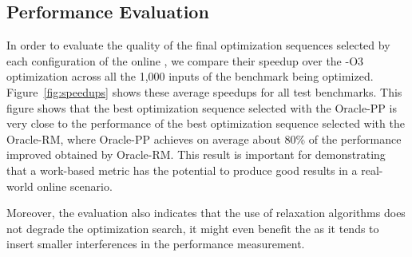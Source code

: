

\subsection{Performance Evaluation}

In order to evaluate the quality of the final optimization sequences selected by
each configuration of the online {\itercomp}, we compare their speedup over the
{\flagstype -O3} optimization across all the 1,000 inputs of the benchmark
being optimized.
Figure~\ref{fig:speedups} shows these average speedups for all test benchmarks.
This figure shows that the best optimization sequence selected with the Oracle-PP
is very close to the performance of the best optimization sequence selected with
the Oracle-RM, where Oracle-PP achieves on average about 80\% of the performance
improved obtained by Oracle-RM.
This result is important for demonstrating that a work-based metric has the
potential to produce good results in a real-world online scenario.


Moreover, the evaluation also indicates that the use of relaxation algorithms
does not degrade the optimization search, it might even benefit the {\itercomp}
as it tends to insert smaller interferences in the performance measurement.


